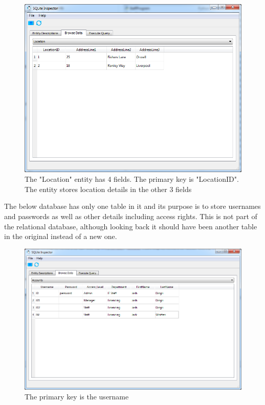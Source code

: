 \begin{figure}[H]
    \includegraphics[width=\textwidth]{./Maintenance/Images/LocationTable.png}
    \caption{The "Location" entity has 4 fields. The primary key is "LocationID". The entity stores location details in the other 3 fields} \label{fig:LocationTable}
\end{figure}

The below database has only one table in it and its purpose is to store usernames and passwords as well as other details including access rights. This is not part of the relational database, although looking back it should have been another table in the original instead of a new one.

\begin{figure}[H]
    \includegraphics[width=\textwidth]{./Maintenance/Images/accountsdb.png}
    \caption{The primary key is the username} \label{fig:accountstable}
\end{figure}

